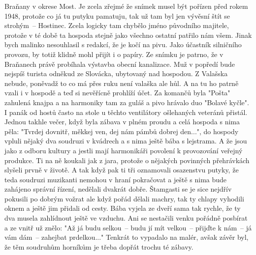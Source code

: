 
Braňany v okrese Most. Je zcela zřejmé že snímek musel být pořízen
před rokem 1948, protože co já tu putyku pamatuju, tak už tam byl jen
vývěsní štít se strohým~-- Hostinec. Zcela logicky tam chybělo jméno
původního majitele, protože v té době ta hospoda stejně jako všechno
ostatní patřilo nám všem. Jinak bych malinko nesouhlasil s redakcí, že
je kočí na pivu. Jako účastník silničního provozu, by totiž klidně
mohl přijít i o papíry. Ze snímku je patrno, že v Braňanech právě
probíhala výstavba obecní kanalizace. Muž v popředí bude nejspíš
turista odněkud ze Slovácka, ubytovaný nad hospodou. Z Valašska
nebude, poněvadž to co má přes ruku není valaška ale hůl. A na tu ho
patrně vzali i v hospodě a teď si nevěřícně prohlíží účet. Za komančů
byla "Pošta" zahulená knajpa a na harmoniky tam za guláš a pivo
hrávalo duo "Bolavé kyčle". I panák od hostů často na stole u těchto
ventilátory ošlehaných veteránů přistál. Jednou takhle večer, když
byla zábava v plném proudu a celá hospoda s nima pěla: "Tvrdej
dovnitř, měkkej ven, dej nám pámbů dobrej den...", do hospody vpluli
nějaký dva soudruzi v kvádrech a s nima ještě bába s lejstrama. A že
jsou jako z odboru kultury a jestli mají harmonikáři povolení k
provozování veřejný produkce. Ti na ně koukali jak z jara, protože o
nějakých povinných přehrávkách slyšeli prvně v životě. A tak když pak
ti tři oznamovali osazenstvu putyky, že teda soudruzi muzikanti
nemohou v hraní pokračovat a ještě s nima bude zahájeno správní
řízení, nedělali dvakrát dobře. Štamgasti se je sice nejdřív pokusili
po dobrým vožrat ale když pořád dělali machry, tak ty chlapy vyhodili
oknem a ještě jim přidali od cesty. Bába vyjela ze dveří sama tak
rychle, že ty dva musela zahlídnout ještě ve vzduchu. Ani se nestačili
venku pořádně posbírat a ze vnitř už znělo: "Až já budu selkou~-- budu
jí mít velkou~-- přijďte k nám~-- já vám dám~-- zahejbat prdelkou..."
Tenkrát to vypadalo na malér, avšak závěr byl, že těm soudruhům
horníkům je třeba dopřát trochu té zábavy.

